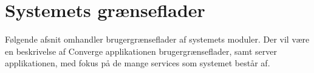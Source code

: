 \chapter{Systemets grænseflader}
Følgende afsnit omhandler brugergrænseflader af systemets moduler. Der vil være en beskrivelse af Converge applikationen brugergrænseflader, samt server applikationen, med fokus på de mange services som systemet består af.  